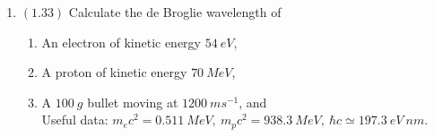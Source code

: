 \documentclass[fleqn]{article}
\begin{document}
\begin{enumerate}
\begin{enumerate}
        \item The angle at which the electrons recoil.

          \textcolor{hwColor}{
            $
              p_{photon}=\dfrac{h}{\lambda}=\dfrac{6.62 \times 10^{-34} ~ Js}{0.0017 \times 10^{-9} m}=3.90 \times 10^{-22}=3.89 \times 10^{-22} \\
              \\
              p=mv \rightarrow p=m\sqrt{\dfrac{2KE}{m}}=9.11 \times 10^{-31} \sqrt{\dfrac{1.315 \times 10^{-13} Js}{9.11 \times 10^{-31} ~ kg}} \\
              \\
              p=4.90 \times 10^{-22} ~ kgm/s \\
              \\
              p_{electron}=p \Rightarrow 4.90 \times 10^{-22} ~ sin(\theta)=3.89 \times 10^{-22} ~ sin(48) \\
              \\
              \Longrightarrow \theta \approx 36.24^{\circ}
            $
          }

      \end{enumerate}

    \item $(\mathbf{1.33})$ Calculate the de Broglie wavelength of
      \begin{enumerate}
        \item An electron of kinetic energy $54 ~ eV$, 
        \item A proton of kinetic energy $70 ~ MeV$, 
        \item A $100 ~ g$ bullet moving at $1200 ~ ms^{-1}$, and \\

        Useful data: $m_ec^2=0.511 ~ MeV, ~ m_pc^2=938.3 ~ MeV, ~ \hbar c \simeq 197.3 ~ eV ~ nm$.
      \end{enumerate}

  \end{enumerate}
\end{document}
